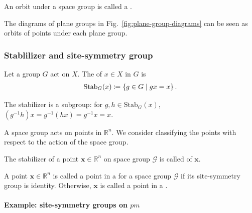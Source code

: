 \begin{screen}
  \begin{defn}
    An orbit under a space group is called a .
  \end{defn}
\end{screen}

The diagrams of plane groups in Fig.~\ref{fig:plane-group-diagrams} can be seen as orbits of points under each plane group.

\subsubsection{Stablilizer and site-symmetry group}

\begin{screen}
  \begin{defn}[stabilizer]
    Let a group $G$ act on $X$.
    The  of $x \in X$ in $G$ is
    \begin{align}
      \mathrm{Stab}_{G}(x) \coloneqq \left\{  g \in G  \mathrel{}\middle|\mathrel{}  gx = x  \right\}.
    \end{align}
  \end{defn}
\end{screen}
The stabilizer is a subgroup: for $g, h \in \mathrm{Stab}_{G}(x)$, $(g^{-1}h) x = g^{-1} (h x) = g^{-1}x = x$.

A space group acts on points in $\mathbb{R}^{n}$.
We consider classifying the points with respect to the action of the space group.
\begin{screen}
  \begin{defn}
    The stabilizer of a point $\bm{x} \in \mathbb{R}^{n}$ on space group $\mathcal{G}$ is called  of $\bm{x}$.
  \end{defn}
\end{screen}

\begin{screen}
  \begin{defn}
    A point $\bm{x} \in \mathbb{R}^{n}$ is called a point in a  for a space group $\mathcal{G}$ if its site-symmetry group is identity.
    Otherwise, $\bm{x}$ is called a point in a .
  \end{defn}
\end{screen}

\paragraph{Example: site-symmetry groups on $pm$}

